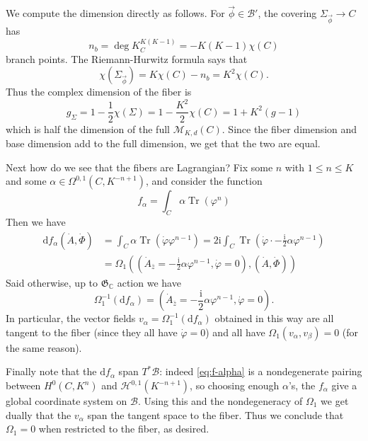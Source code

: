 \documentclass[12pt,letterpaper,reqno]{article}
\numberwithin{equation}{section}
\newcommand{\fG}{{\mathfrak G}}
\newcommand{\cB}{\ensuremath{\mathcal B}}
\newcommand{\cM}{\ensuremath{\mathcal M}}
\newcommand{\cH}{\ensuremath{\mathcal H}}
\newcommand{\C}{\ensuremath{\mathbb C}}
\newcommand{\half}{\ensuremath{\frac{1}{2}}}
\newcommand{\I}{{\mathrm i}}
\newcommand{\de}{\mathrm{d}}
\DeclareMathOperator{\Tr}{Tr}
\begin{document}
\begin{pf} We compute the dimension directly as follows.
For $\vec\phi \in \cB'$,
the covering $\Sigma_{\vec \phi} \to C$ has
\begin{equation}
  n_b = \deg K_C^{K(K-1)} = -K(K-1)\chi(C)
\end{equation}
branch points. The Riemann-Hurwitz formula says
that
\begin{equation}
  \chi(\Sigma_{\vec \phi}) = K \chi(C) - n_b = K^2 \chi(C).
\end{equation}
Thus the complex dimension of the fiber is
\begin{equation}
  g_{\Sigma} = 1 - \half \chi(\Sigma) = 1 - \frac{K^2}{2} \chi(C) = 1 + K^2(g-1)
\end{equation}
which is half the dimension of the full $\cM_{K,d}(C)$.
Since the fiber dimension and base dimension add to the full dimension,
we get that the two are equal.

Next how do we see that the fibers are Lagrangian? 
Fix some $n$ with $1 \le n \le K$ and some
$\alpha \in \Omega^{0,1}(C,K^{-n+1})$, and consider the function
\begin{equation} \label{eq:f-alpha}
  f_\alpha = \int_C \alpha \Tr(\varphi^n)
\end{equation}
Then we have 
\begin{align}
 \de f_\alpha(\dot A, \dot \Phi) &= \int_C \alpha \Tr(\dot\varphi \varphi^{n-1}) = 2 \I \int_C \Tr\left(\dot\varphi \cdot -\frac{\I}{2} \alpha \varphi^{n-1} \right) \\
 &= \Omega_1\left((\dot{A}_{\bar z} = -\frac{\I}{2} \alpha \varphi^{n-1}, \dot\varphi = 0),(\dot A, \dot \Phi)\right)
\end{align}
Said otherwise, up to $\fG_\C$ action we have
\begin{equation}
  \Omega_1^{-1} (\de f_\alpha) = \left(\dot{A}_{\bar z} = -\frac{\I}{2} \alpha \varphi^{n-1}, \dot\varphi = 0\right).
\end{equation}
In particular, the vector fields $v_\alpha = \Omega_1^{-1}(\de f_\alpha)$ 
obtained in this way are all tangent to the fiber (since they all have
$\dot\varphi = 0$) and all have $\Omega_1(v_\alpha, v_\beta) = 0$ (for
the same reason). 

Finally note that the $\de f_\alpha$ span $T^* \cB$: indeed
\eqref{eq:f-alpha} is a nondegenerate pairing between $H^0(C,K^n)$ and
$\cH^{0,1}(K^{-n+1})$, so choosing enough
$\alpha$'s, the $f_\alpha$ give a global coordinate system on
$\cB$. Using this and the nondegeneracy of $\Omega_1$
we get dually that the $v_\alpha$ span the tangent space to the 
fiber. Thus we conclude that $\Omega_1 = 0$ when restricted to the fiber, as 
desired.
\end{pf}
\end{document}
